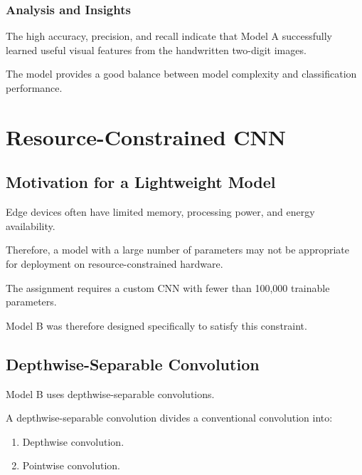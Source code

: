 \documentclass[12pt,a4paper]{report}
\begin{document}
\subsection{Analysis and Insights}

The high accuracy, precision, and recall indicate that Model A
successfully learned useful visual features from the handwritten
two-digit images.

The model provides a good balance between model complexity and
classification performance.



\chapter{Resource-Constrained CNN}

\section{Motivation for a Lightweight Model}

Edge devices often have limited memory, processing power, and
energy availability.

Therefore, a model with a large number of parameters may not be
appropriate for deployment on resource-constrained hardware.

The assignment requires a custom CNN with fewer than 100,000
trainable parameters.

Model B was therefore designed specifically to satisfy this
constraint.

\section{Depthwise-Separable Convolution}

Model B uses depthwise-separable convolutions.

A depthwise-separable convolution divides a conventional
convolution into:

\begin{enumerate}
    \item Depthwise convolution.
    \item Pointwise convolution.
\end{enumerate}
\end{document}
